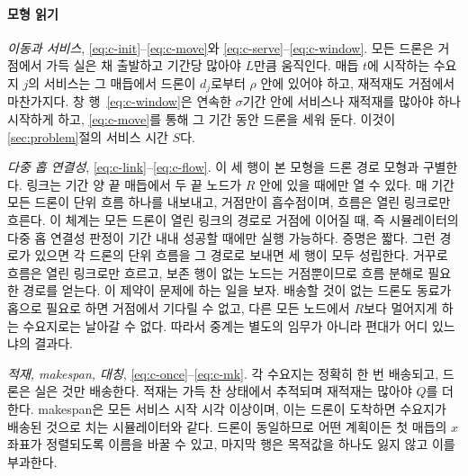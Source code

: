 \documentclass[final,5p,times,twocolumn]{elsarticle}
\begin{document}
\paragraph{모형 읽기}
\emph{이동과 서비스}, \eqref{eq:c-init}--\eqref{eq:c-move}와 \eqref{eq:c-serve}--\eqref{eq:c-window}.
모든 드론은 거점에서 가득 실은 채 출발하고 기간당 많아야 $L$만큼 움직인다. 매듭 $t$에 시작하는 수요지
$j$의 서비스는 그 매듭에서 드론이 $d_j$로부터 $\rho$ 안에 있어야 하고, 재적재도 거점에서 마찬가지다.
창 행~\eqref{eq:c-window}은 연속한 $\sigma$기간 안에 서비스나 재적재를 많아야 하나 시작하게 하고,
\eqref{eq:c-move}를 통해 그 기간 동안 드론을 세워 둔다. 이것이 \ref{sec:problem}절의 서비스 시간 $S$다.

\emph{다중 홉 연결성}, \eqref{eq:c-link}--\eqref{eq:c-flow}. 이 세 행이 본 모형을 드론 경로 모형과
구별한다. 링크는 기간 양 끝 매듭에서 두 끝 노드가 $R$ 안에 있을 때에만 열 수 있다. 매 기간 모든
드론이 단위 흐름 하나를 내보내고, 거점만이 흡수점이며, 흐름은 열린 링크로만 흐른다. 이 체계는 모든
드론이 열린 링크의 경로로 거점에 이어질 때, 즉 시뮬레이터의 다중 홉 연결성 판정이 기간 내내
성공할 때에만 실행 가능하다. 증명은 짧다. 그런 경로가 있으면 각 드론의 단위 흐름을 그 경로로 보내면
세 행이 모두 성립한다. 거꾸로 흐름은 열린 링크로만 흐르고, 보존 행이 없는 노드는 거점뿐이므로 흐름
분해로 필요한 경로를 얻는다. 이 제약이 문제에 하는 일을 보자. 배송할 것이 없는 드론도 동료가 홉으로
필요로 하면 거점에서 기다릴 수 없고, 다른 모든 노드에서 $R$보다 멀어지게 하는 수요지로는 날아갈 수
없다. 따라서 중계는 별도의 임무가 아니라 편대가 어디 있느냐의 결과다.

\emph{적재, makespan, 대칭}, \eqref{eq:c-once}--\eqref{eq:c-mk}. 각 수요지는 정확히 한 번
배송되고, 드론은 실은 것만 배송한다. 적재는 가득 찬 상태에서 추적되며 재적재는 많아야 $Q$를 더한다.
makespan은 모든 서비스 시작 시각 이상이며, 이는 드론이 도착하면 수요지가 배송된 것으로 치는
시뮬레이터와 같다. 드론이 동일하므로 어떤 계획이든 첫 매듭의 $x$ 좌표가 정렬되도록 이름을 바꿀 수
있고, 마지막 행은 목적값을 하나도 잃지 않고 이를 부과한다.
\end{document}
